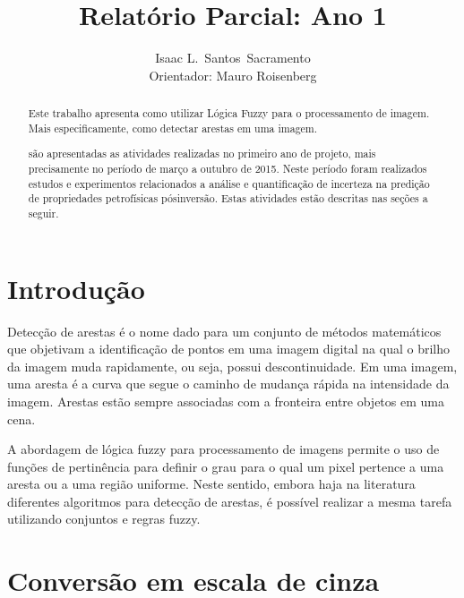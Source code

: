 \documentclass[11pt]{article}
\title{Relatório Parcial: Ano 1}
\author{Isaac L.\ Santos\ Sacramento \\ Orientador: Mauro Roisenberg}
\begin{document}
\lstset{language=C++,basicstyle=\small,
        stringstyle=\ttfamily,showstringspaces=false}

\singlespace
\maketitle

\begin{abstract}                %
Este trabalho apresenta como utilizar Lógica Fuzzy para o processamento de imagem. Mais especificamente, 
como detectar arestas em uma imagem. 


são apresentadas as atividades realizadas no primeiro ano de projeto, mais precisamente no
período de março a outubro de 2015. Neste período foram realizados estudos e experimentos relacionados a análise
e quantificação de incerteza na predição de propriedades petrofísicas pós\-inversão. Estas atividades estão descritas
nas seções a seguir.

\end{abstract}

\doublespace
\setcounter{secnumdepth}{2}

\section{Introdução}
Detecção de arestas é o nome dado para um conjunto de métodos matemáticos que objetivam a identificação de pontos em uma
imagem digital na qual o brilho da imagem muda rapidamente, ou seja, possui descontinuidade.
Em uma imagem, uma aresta é a curva que segue o caminho de mudança rápida na intensidade da imagem.
Arestas estão sempre associadas com a fronteira entre objetos em uma cena.

A abordagem de lógica fuzzy para processamento de imagens permite o uso de funções de pertinência para definir
o grau para o qual um pixel pertence a uma aresta ou a uma região uniforme. Neste sentido, embora haja
na literatura diferentes algoritmos para detecção de arestas, é possível realizar a mesma tarefa utilizando conjuntos
e regras fuzzy.


\section{Conversão em escala de cinza}
\end{document}

